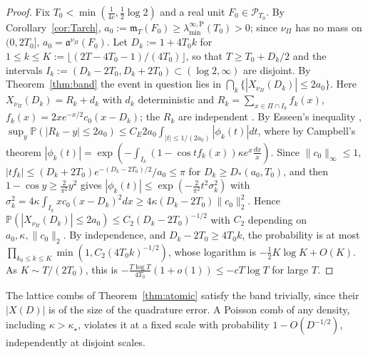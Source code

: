 \documentclass[11pt]{amsart}
\theoremstyle{definition}
\theoremstyle{remark}
\newcommand{\mT}{\mathfrak m_T}
\newcommand{\laminfP}{\lambda^{\infty,\mathrm P}_{\min}}
\begin{document}
\begin{proof}
Fix $T_0<\min(\frac1{4c},\frac12\log2)$ and a real unit $F_0\in\mathcal P_{T_0}$. By Corollary~\ref{cor:Tarch},
$a_0:=\mT(F_0)\ge\laminfP(T_0)>0$; since $\nu_\Pi$ has no mass on $(0,2T_0]$, $a_0=\mathfrak a^{\nu_\Pi}(F_0)$. Let $D_k:=1+4T_0k$ for
$1\le k\le K:=\lfloor(2T-4T_0-1)/(4T_0)\rfloor$, so that $T\ge T_0+D_k/2$ and the intervals $I_k:=(D_k-2T_0,D_k+2T_0)\subset(\log2,\infty)$ are
disjoint. By Theorem~\ref{thm:band} the event in question lies in $\bigcap_k\{|X_{\nu_\Pi}(D_k)|\le2a_0\}$. Here
$X_{\nu_\Pi}(D_k)=R_k+d_k$ with $d_k$ deterministic and $R_k=\sum_{x\in\Pi\cap I_k}f_k(x)$, $f_k(x)=2xe^{-x/2}c_0(x-D_k)$; the $R_k$
are independent \cite[\S2.2]{Kingman1993}. By Esseen's inequality \cite[Ch.~III, Lemma~3]{Petrov1975},
$\sup_y\mathbb P(|R_k-y|\le2a_0)\le C_E2a_0\int_{|t|\le1/(2a_0)}|\phi_k(t)|dt$, where by Campbell's theorem
\cite[\S3.2]{Kingman1993} $|\phi_k(t)|=\exp(-\int_{I_k}(1-\cos tf_k(x))\kappa e^x\frac{dx}x)$. Since $\|c_0\|_\infty\le1$,
$|tf_k|\le(D_k+2T_0)e^{-(D_k-2T_0)/2}/a_0\le\pi$ for $D_k\ge D_*(a_0,T_0)$, and then $1-\cos y\ge\frac2{\pi^2}y^2$ gives
$|\phi_k(t)|\le\exp(-\frac2{\pi^2}t^2\sigma_k^2)$ with
$\sigma_k^2=4\kappa\int_{I_k}xc_0(x-D_k)^2dx\ge4\kappa(D_k-2T_0)\|c_0\|_2^2$. Hence
$\mathbb P(|X_{\nu_\Pi}(D_k)|\le2a_0)\le C_2(D_k-2T_0)^{-1/2}$ with $C_2$ depending on $a_0,\kappa,\|c_0\|_2$. By independence, and
$D_k-2T_0\ge4T_0k$, the probability is at most $\prod_{k_0\le k\le K}\min(1,C_2(4T_0k)^{-1/2})$, whose logarithm is
$-\frac12K\log K+O(K)$. As $K\sim T/(2T_0)$, this is $-\frac{T\log T}{4T_0}(1+o(1))\le-cT\log T$ for large $T$.
\end{proof}

The lattice combs of Theorem~\ref{thm:atomic} satisfy the band trivially, since their $|X(D)|$ is of the size of the quadrature
error. A Poisson comb of any density, including $\kappa>\kappa_\star$, violates it at a fixed scale with probability
$1-O(D^{-1/2})$, independently at disjoint scales.
\end{document}
